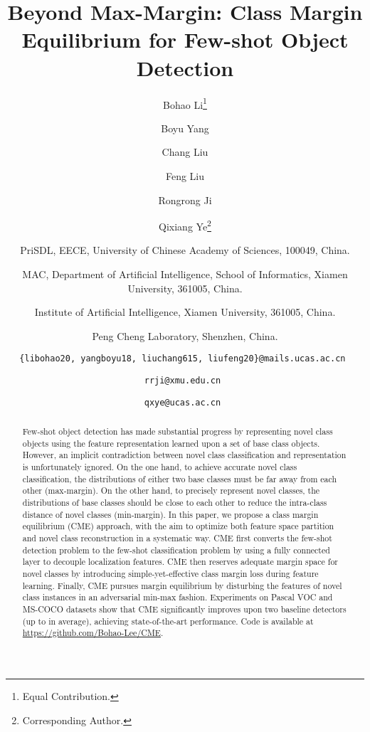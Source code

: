 \documentclass[final]{cvpr}
\begin{document}
\title{Beyond Max-Margin: Class Margin Equilibrium for Few-shot Object Detection}

\author{Bohao Li\thanks{Equal Contribution.} \and Boyu Yang\footnotemark[1] \and Chang Liu \and Feng Liu \and Rongrong Ji \and Qixiang Ye\thanks{Corresponding Author.}
\and PriSDL, EECE, University of Chinese Academy of Sciences, 100049, China.  \and  MAC, Department of Artificial Intelligence, School of Informatics, Xiamen University, 361005, China. \and Institute of Artificial Intelligence, Xiamen University, 361005, China. \and Peng Cheng Laboratory, Shenzhen, China.

\and\tt\small \{libohao20, yangboyu18, liuchang615, liufeng20\}@mails.ucas.ac.cn 
\and\tt\small rrji@xmu.edu.cn \and\tt\small qxye@ucas.ac.cn
}

\maketitle


\begin{abstract}
Few-shot object detection has made substantial progress by representing novel class objects using the feature representation learned upon a set of base class objects.
However, an implicit contradiction between novel class classification and representation is unfortunately ignored.
On the one hand, to achieve accurate novel class classification, the distributions of either two base classes must be far away from each other (max-margin).
On the other hand, to precisely represent novel classes, the distributions of base classes should be close to each other to reduce the intra-class distance of novel classes (min-margin).
In this paper, we propose a class margin equilibrium (CME) approach, with the aim to optimize both feature space partition and novel class reconstruction in a systematic way.
CME first converts the few-shot detection problem to the few-shot classification problem by using a fully connected layer to decouple localization features.
CME then reserves adequate margin space for novel classes by introducing simple-yet-effective class margin loss during feature learning.
Finally, CME pursues margin equilibrium by disturbing the features of novel class instances in an adversarial min-max fashion.
Experiments on Pascal VOC and MS-COCO datasets show that CME significantly improves upon two baseline detectors (up to  in average), achieving state-of-the-art performance. Code is available at \href{https://github.com/Bohao-Lee/CME}{\color{magenta}https://github.com/Bohao-Lee/CME}.

\end{abstract}
\end{document}
